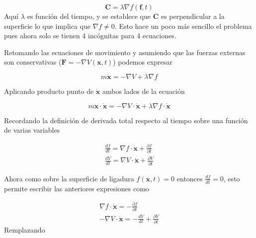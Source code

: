 \begin{enumerate}
            \begin{equation*}
                \mathbf{C} = \lambda\nabla f(\mathbf{f},t)
            \end{equation*}
            Aquí $\lambda$ es función del tiempo, y se establece que $\mathbf{C}$ es perpendicular a la superficie lo que implica que $\nabla f \neq 0$. Esto hace un poco más sencillo el problema pues ahora solo se tienen 4 incógnitas para 4 ecuaciones.


            Retomando las ecuaciones de movimiento y asumiendo que las fuerzas externas son conservativas ($\mathbf{F} = -\nabla V(\mathbf{x},t)$) podemos expresar 

            \begin{equation*}
                m\ddot{\mathbf{x}} = -\nabla V + \lambda\nabla f
            \end{equation*}

            Aplicando producto punto de $\dot{\mathbf{x}}$ ambos lados de la ecuación

            \begin{equation*}
                m\ddot{\mathbf{x}}\cdot \dot{\mathbf{x}} = -\nabla V \cdot \dot{\mathbf{x}}+ \lambda\nabla f \cdot \dot{\mathbf{x}}
            \end{equation*}

            Recordando la definición de derivada total respecto al tiempo sobre una función de varias variables 

            \begin{gather*}
                \frac{df}{dt} = \nabla f \cdot \dot{\mathbf{x}} + \frac{\partial f}{\partial t}\\
                \frac{dV}{dt} = \nabla V \cdot \dot{\mathbf{x}} + \frac{\partial V}{\partial t}
            \end{gather*}

            Ahora como sobre la superficie de ligadura $f(\mathbf{x},t) = 0$ entonces $\frac{df}{dt} = 0$, esto permite escribir las anteriores expresiones como 

            \begin{gather*}
                \nabla f \cdot \mathbf{\dot{x}}=  - \frac{\partial f}{\partial t}\\
                -\nabla V\cdot \dot{\mathbf{x}} = -\frac{dV}{dt} + \frac{\partial V}{\partial t}
            \end{gather*}
            Remplazando 


\end{enumerate}

